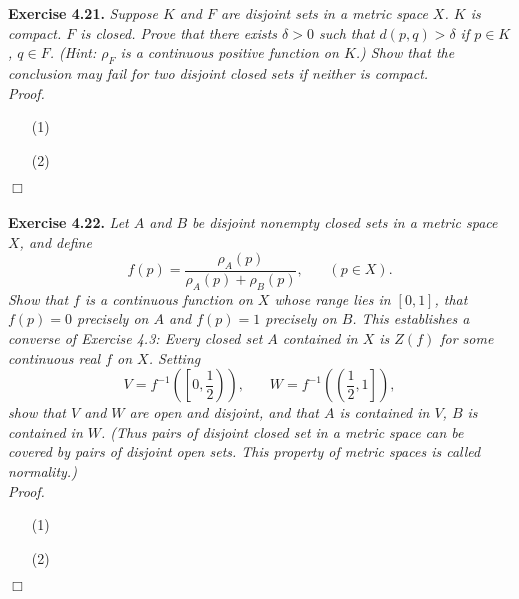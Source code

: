 \documentclass{article}
\begin{document}



\textbf{Exercise 4.21.}
\emph{Suppose $K$ and $F$ are disjoint sets in a metric space $X$.
$K$ is compact.
$F$ is closed.
Prove that there exists $\delta > 0$ such that $d(p,q) > \delta$ if $p \in K$, $q \in F$.
(Hint: $\rho_F$ is a continuous positive function on $K$.)
Show that the conclusion may fail for two disjoint closed sets if neither is compact.} \\

\emph{Proof.}
\begin{enumerate}
\item[(1)]

\item[(2)]
\end{enumerate}
$\Box$\\\\






\textbf{Exercise 4.22.}
\emph{Let $A$ and $B$ be disjoint nonempty closed sets in a metric space $X$,
and define
\[
  f(p) = \frac{\rho_A(p)}{\rho_A(p)+\rho_B(p)}, \:\:\:\:\:\:\:\: (p \in X).
\]
Show that $f$ is a continuous function on $X$ whose range lies in $[0,1]$,
that $f(p) = 0$ precisely on $A$ and $f(p) = 1$ precisely on $B$.
This establishes a converse of Exercise 4.3:
Every closed set $A$ contained in $X$ is $Z(f)$ for some continuous real $f$ on $X$.
Setting
\[
  V = f^{-1}{\left(\left[0,\frac{1}{2}\right)\right)},
  \:\:\:\:\:\:\:\:
  W = f^{-1}{\left(\left(\frac{1}{2},1\right]\right)},
\]
show that $V$ and $W$ are open and disjoint,
and that $A$ is contained in $V$, $B$ is contained in $W$.
(Thus pairs of disjoint closed set in a metric space can be covered by pairs of disjoint open sets.
This property of metric spaces is called normality.)} \\

\emph{Proof.}
\begin{enumerate}
\item[(1)]

\item[(2)]
\end{enumerate}
$\Box$\\\\
\end{document}
